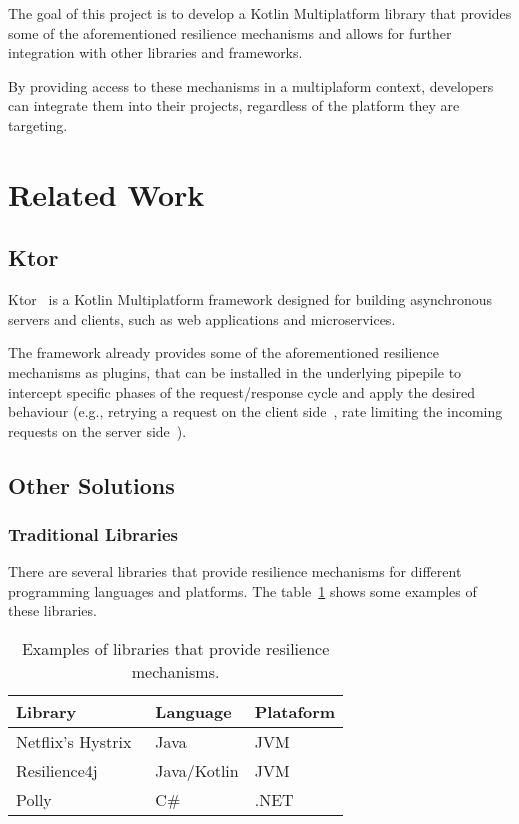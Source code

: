 The goal of this project is to develop a Kotlin Multiplatform library that provides some of the aforementioned resilience mechanisms and allows for further integration with other libraries and frameworks.

By providing access to these mechanisms in a multiplaform context, developers can integrate them into their projects, regardless of the platform they are targeting.


\section{Related Work}\label{sec:related-work}

\subsection{Ktor}\label{subsec:ktor}
Ktor~\cite{ktor} is a Kotlin Multiplatform framework designed for building asynchronous servers and clients, such as web applications and microservices.

The framework already provides some of the aforementioned resilience mechanisms as plugins,
that can be installed in the underlying pipepile
to intercept specific phases of the request/response cycle and apply the desired behaviour
(e.g., retrying a request on the client side~\cite{ktor-client-retry},
rate limiting the incoming requests on the server side~\cite{ktor-server-rate-limit}).

\subsection{Other Solutions}\label{subsec:other-solutions}

\subsubsection{Traditional Libraries}

There are several libraries that provide resilience mechanisms for different programming languages and platforms.
The table~\ref{tab:resilience_libraries} shows some examples of these libraries.

\begin{table}[!htb]
    \centering
    \caption{Examples of libraries that provide resilience mechanisms.}
    \label{tab:resilience_libraries}
    \vspace{0.3cm}
    \begin{tabular}{|l|l|l}
        \hline
        \textbf{Library}                         & \textbf{Language} & \textbf{Plataform} \\ \hline
        Netflix's Hystrix~\cite{netflix-hystrix} & Java              & JVM                \\ \hline
        Resilience4j~\cite{resilience4j}         & Java/Kotlin       & JVM                \\ \hline
        Polly ~\cite{polly-dotnet}               & C\#               & .NET               \\
        \hline
    \end{tabular}
\end{table}

